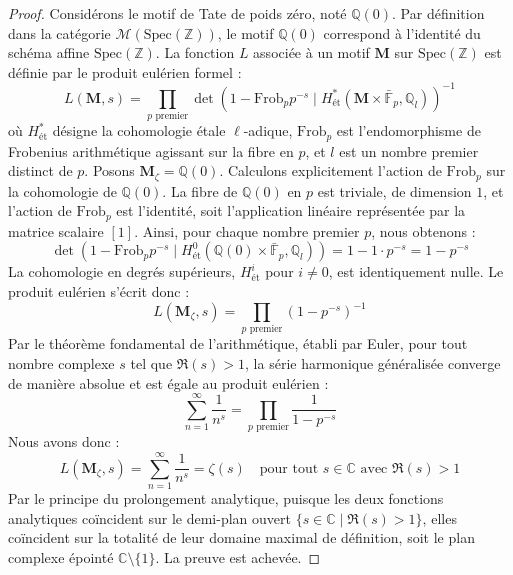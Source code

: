 \documentclass[
]{article}
\begin{document}
\begin{proof}
Considérons le motif de Tate de poids zéro, noté
\(\mathbb{Q}(0)\). Par définition dans la catégorie
\(\mathcal{M}(\mathrm{Spec}(\mathbb{Z}))\), le motif \(\mathbb{Q}(0)\)
correspond à l'identité du schéma affine \(\mathrm{Spec}(\mathbb{Z})\).
La fonction \(L\) associée à un motif \(\mathbf{M}\) sur
\(\mathrm{Spec}(\mathbb{Z})\) est définie par le produit eulérien formel :
\begin{equation*}
L(\mathbf{M}, s) = \prod_{p \text{ premier}} \det\left(1 - \mathrm{Frob}_p p^{-s} \mid H^*_{\text{ét}}(\mathbf{M} \times \bar{\mathbb{F}}_p, \mathbb{Q}_l)\right)^{-1}
\end{equation*}
où \(H^*_{\text{ét}}\) désigne la cohomologie étale \(\ell\)-adique,
\(\mathrm{Frob}_p\) est l'endomorphisme de Frobenius arithmétique
agissant sur la fibre en \(p\), et \(l\) est un nombre premier distinct
de \(p\). Posons \(\mathbf{M}_{\zeta} = \mathbb{Q}(0)\). Calculons
explicitement l'action de \(\mathrm{Frob}_p\) sur la cohomologie de
\(\mathbb{Q}(0)\). La fibre de \(\mathbb{Q}(0)\) en \(p\) est triviale,
de dimension \(1\), et l'action de \(\mathrm{Frob}_p\) est l'identité,
soit l'application linéaire représentée par la matrice scalaire \([1]\).
Ainsi, pour chaque nombre premier \(p\), nous obtenons :
\begin{equation*}
\det\left(1 - \mathrm{Frob}_p p^{-s} \mid H^0_{\text{ét}}(\mathbb{Q}(0) \times \bar{\mathbb{F}}_p, \mathbb{Q}_l)\right) = 1 - 1 \cdot p^{-s} = 1 - p^{-s}
\end{equation*}
La cohomologie en degrés supérieurs, \(H^i_{\text{ét}}\) pour
\(i \neq 0\), est identiquement nulle. Le produit eulérien s'écrit donc :
\begin{equation*}
L(\mathbf{M}_{\zeta}, s) = \prod_{p \text{ premier}} (1 - p^{-s})^{-1}
\end{equation*}
Par le théorème fondamental de l'arithmétique, établi par Euler, pour
tout nombre complexe \(s\) tel que \(\Re(s) > 1\), la série harmonique
généralisée converge de manière absolue et est égale au produit eulérien :
\begin{equation*}
\sum_{n=1}^{\infty} \frac{1}{n^s} = \prod_{p \text{ premier}} \frac{1}{1 - p^{-s}}
\end{equation*}
Nous avons donc :
\begin{equation*}
L(\mathbf{M}_{\zeta}, s) = \sum_{n=1}^{\infty} \frac{1}{n^s} = \zeta(s) \quad \text{pour tout } s \in \mathbb{C} \text{ avec } \Re(s) > 1
\end{equation*}
Par le principe du
prolongement analytique, puisque les deux fonctions analytiques
coïncident sur le demi-plan ouvert
\(\{s \in \mathbb{C} \mid \Re(s) > 1\}\), elles coïncident sur la
totalité de leur domaine maximal de définition, soit le plan complexe
épointé \(\mathbb{C} \setminus \{1\}\). La preuve est achevée.
\end{proof}
\end{document}
